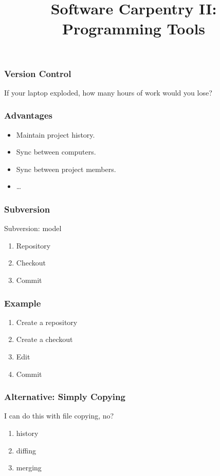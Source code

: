 
\title{Software Carpentry II: Programming Tools}

\frame{\maketitle}

\begin{frame}[fragile]
\frametitle{Version Control}

If your laptop exploded, how many hours of work would you lose?
\end{frame}

\begin{frame}[fragile]
\frametitle{Advantages}
\begin{itemize}
\item Maintain project history.
\item Sync between computers.
\item Sync between project members.
\item \ldots
\end{itemize}
\end{frame}

\begin{frame}[fragile]
\frametitle{Subversion}
\begin{block}{Subversion: model}
\begin{enumerate}
\item Repository
\item Checkout
\item Commit
\end{enumerate}
\end{block}
\end{frame}

\begin{frame}[fragile]
\frametitle{Example}
\begin{enumerate}
\item Create a repository
\item Create a checkout
\item Edit
\item Commit
\end{enumerate}
\end{frame}

\begin{frame}[fragile]
\frametitle{Alternative: Simply Copying}

I can do this with file copying, no?

\pause

\begin{enumerate}
\item history
\item diffing
\item merging
\end{enumerate}
\end{frame}

